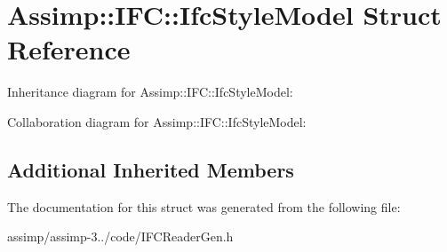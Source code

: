 \hypertarget{struct_assimp_1_1_i_f_c_1_1_ifc_style_model}{\section{Assimp\+:\+:I\+F\+C\+:\+:Ifc\+Style\+Model Struct Reference}
\label{struct_assimp_1_1_i_f_c_1_1_ifc_style_model}
}


Inheritance diagram for Assimp\+:\+:I\+F\+C\+:\+:Ifc\+Style\+Model\+:


Collaboration diagram for Assimp\+:\+:I\+F\+C\+:\+:Ifc\+Style\+Model\+:
\subsection*{Additional Inherited Members}


The documentation for this struct was generated from the following file\+:\begin{DoxyCompactItemize}
\item 
assimp/assimp-\/3../code/I\+F\+C\+Reader\+Gen.\+h\end{DoxyCompactItemize}
